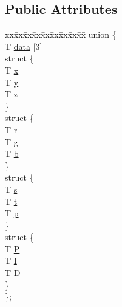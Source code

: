 \subsection*{Public Attributes}
\begin{DoxyCompactItemize}
\item 
\begin{tabbing}
xx\=xx\=xx\=xx\=xx\=xx\=xx\=xx\=xx\=\kill
union \{\\
\>T \hyperlink{structNSVec3_a82314c4b8d4619ba32b4b3f9c58f5a2c}{data} \mbox{[}3\mbox{]}\\
\>struct \{\\
\>\>T \hyperlink{structNSVec3_abc4e7ffce298313829ad938a5af61818}{x}\\
\>\>T \hyperlink{structNSVec3_a5498f3161922dedec454c81ab4e54ae3}{y}\\
\>\>T \hyperlink{structNSVec3_a6731c5158baf48408a4311b6b13aafb3}{z}\\
\>\} \\
\>struct \{\\
\>\>T \hyperlink{structNSVec3_a7d4a1f0856df05844ec136f59033e32a}{r}\\
\>\>T \hyperlink{structNSVec3_af4da81fc8e3a7ce2c16481ca7ac01021}{g}\\
\>\>T \hyperlink{structNSVec3_aadd7462fb6f7d7df83cb8ffd1645eb8b}{b}\\
\>\} \\
\>struct \{\\
\>\>T \hyperlink{structNSVec3_a5f429613450844e0b8a8fbb502ee6342}{s}\\
\>\>T \hyperlink{structNSVec3_a3df97592d42f0f53d8b48fbb5c95b506}{t}\\
\>\>T \hyperlink{structNSVec3_a8d244562d8e23e387b9e8102dfd3a14d}{p}\\
\>\} \\
\>struct \{\\
\>\>T \hyperlink{structNSVec3_ad4f0cefc81041963c730f9d60093442e}{P}\\
\>\>T \hyperlink{structNSVec3_a2b2d6da3c41bfa78589cd09b79b09de6}{I}\\
\>\>T \hyperlink{structNSVec3_abb8768d33c0752160bd78e978d6625b9}{D}\\
\>\} \\
\}; \\

\end{tabbing}\end{DoxyCompactItemize}


